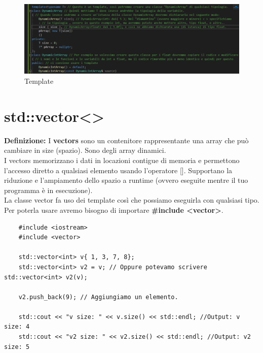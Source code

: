 \begin{figure}[ht]
	\centering
	\includegraphics[width=1.2\textwidth, height=1.2\textheight, keepaspectratio]{./imgs/template.png}
	\caption{Template}
	\label{fig:template}
\end{figure}




\section{std::vector<>}

\textsf{\small \textbf{Definizione:} I \textbf{vectors} sono un contenitore rappresentante una array che può cambiare in size (spazio). Sono degli array dinamici.} \\

\textsf{\small I vectors memorizzano i dati in locazioni contigue di memoria e permettono l'accesso diretto a qualsiasi elemento usando l'operatore []. Supportano la riduzione e l'ampiamento dello spazio a runtime (ovvero eseguite mentre il tuo programma è in esecuzione).} \\

\textsf{\small La classe vector fa uso dei template così che possiamo eseguirla con qualsiasi tipo. Per poterla usare avremo bisogno di importare \textbf{\#include <vector>}.} \\

\begin{lstlisting}
	#include <iostream>
	#include <vector>
	
	std::vector<int> v{ 1, 3, 7, 8};
	std::vector<int> v2 = v; // Oppure potevamo scrivere std::vector<int> v2(v);
	
	v2.push_back(9); // Aggiungiamo un elemento.
	
	std::cout << "v size: " << v.size() << std::endl; //Output: v size: 4
	std::cout << "v2 size: " << v2.size() << std::endl; //Output: v2 size: 5
\end{lstlisting}

